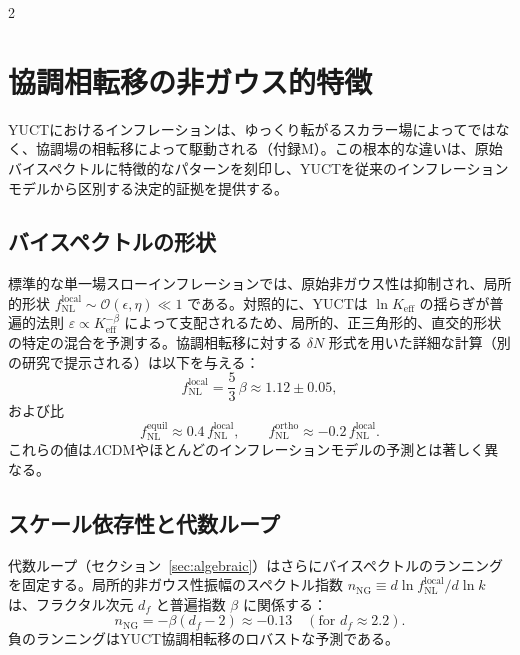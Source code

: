 \documentclass[11pt,a4paper]{article}
\begin{document}
\begin{multicols}{2}
		\section{協調相転移の非ガウス的特徴}
		\label{sec:nongaussian}
		
		YUCTにおけるインフレーションは、ゆっくり転がるスカラー場によってではなく、協調場の相転移によって駆動される（付録M）。この根本的な違いは、原始バイスペクトルに特徴的なパターンを刻印し、YUCTを従来のインフレーションモデルから区別する決定的証拠を提供する。
		
		\subsection{バイスペクトルの形状}
		標準的な単一場スローインフレーションでは、原始非ガウス性は抑制され、局所的形状 \(f_{\mathrm{NL}}^{\mathrm{local}} \sim \mathcal{O}(\epsilon,\eta) \ll 1\) である。対照的に、YUCTは \(\ln K_{\mathrm{eff}}\) の揺らぎが普遍的法則 \(\varepsilon \propto K_{\mathrm{eff}}^{-\beta}\) によって支配されるため、局所的、正三角形的、直交的形状の特定の混合を予測する。協調相転移に対する \(\delta N\) 形式を用いた詳細な計算（別の研究で提示される）は以下を与える：
		\begin{equation}
			f_{\mathrm{NL}}^{\mathrm{local}} = \frac{5}{3}\,\beta \approx 1.12 \pm 0.05,
		\end{equation}
		および比
		\begin{equation}
			f_{\mathrm{NL}}^{\mathrm{equil}} \approx 0.4\, f_{\mathrm{NL}}^{\mathrm{local}}, \qquad
			f_{\mathrm{NL}}^{\mathrm{ortho}} \approx -0.2\, f_{\mathrm{NL}}^{\mathrm{local}}.
		\end{equation}
		これらの値は\(\Lambda\)CDMやほとんどのインフレーションモデルの予測とは著しく異なる。
		
		\subsection{スケール依存性と代数ループ}
		代数ループ（セクション~\ref{sec:algebraic}）はさらにバイスペクトルのランニングを固定する。局所的非ガウス性振幅のスペクトル指数 \(n_{\mathrm{NG}} \equiv d\ln f_{\mathrm{NL}}^{\mathrm{local}} / d\ln k\) は、フラクタル次元 \(d_f\) と普遍指数 \(\beta\) に関係する：
		\begin{equation}
			n_{\mathrm{NG}} = -\beta (d_f - 2) \approx -0.13 \quad (\text{for } d_f \approx 2.2).
		\end{equation}
		負のランニングはYUCT協調相転移のロバストな予測である。
		

\end{multicols}
\end{document}
